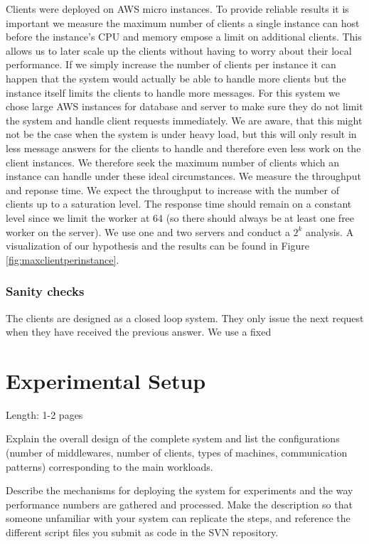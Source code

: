 \documentclass[11pt]{article}
\begin{document}
Clients were deployed on AWS micro instances. To provide reliable results it is important we measure the maximum number of clients a single instance can host before the instance's CPU and memory empose a limit on additional clients. This allows us to later scale up the clients without having to worry about their local performance. If we simply increase the number of clients per instance it can happen that the system would actually be able to handle more clients but the instance itself limits the clients to handle more messages.
For this system we chose large AWS instances for database and server to make sure they do not limit the system and handle client requests immediately. We are aware, that this might not be the case when the system is under heavy load, but this will only result in less message answers for the clients to handle and therefore even less work on the client instances. We therefore seek the maximum number of clients which an instance can handle under these ideal circumstances.
We measure the throughput and reponse time. We expect the throughput to increase with the number of clients up to a saturation level. The response time should remain on a constant level since we limit the worker at 64 (so there should always be at least one free worker on the server). We use one and two servers and conduct a $2^k$ analysis.
A visualization of our hypothesis and the results can be found in Figure \ref{fig:maxclientperinstance}.

\subsubsection{Sanity checks}\label{sec:sanity-checks}
The clients are designed as a closed loop system. They only issue the next request when they have received the previous answer.
We use a fixed 
\section{Experimental Setup}\label{sec:experimental-setup}

Length: 1-2 pages

Explain the overall design of the complete system and list the
configurations (number of middlewares, number of clients, types of
machines, communication patterns) corresponding to the main workloads.

Describe the mechanisms for deploying the system for experiments and the
way performance numbers are gathered and processed. Make the description
so that someone unfamiliar with your system can replicate the steps, and
reference the different script files you submit as code in the SVN
repository.
\end{document}
